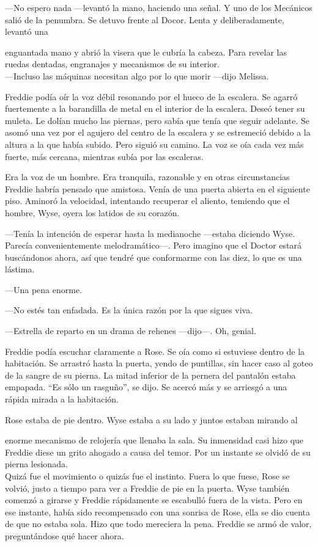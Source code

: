 {---No espero nada ---levantó la mano, haciendo una señal. Y uno de
	los Mecánicos salió de la penumbra. Se detuvo frente al Docor. Lenta
y deliberadamente, levantó una}

{enguantada mano y abrió la visera que le cubría la cabeza. Para
	revelar las ruedas dentadas, engranajes y mecanismos de su interior.\\
	---Incluso las máquinas necesitan algo por lo que morir ---dijo
Melissa.}

{Freddie podía oír la voz débil resonando por el hueco de la
	escalera. Se agarró fuertemente a la barandilla de metal en el
	interior de la escalera. Deseó tener su muleta. Le dolían mucho
	las piernas, pero sabía que tenía que seguir adelante. Se asomó una
	vez por el agujero del centro de la escalera y se estremeció debido a la
	altura a la que había subido. Pero siguió su camino. La voz se oía
cada vez más fuerte, más cercana, mientras subía por las escaleras.}

{Era la voz de un hombre. Era tranquila, razonable y en otras
	circunstancias Freddie habría pensado que amistosa. Venía de una
	puerta abierta en el siguiente piso. Aminoró la velocidad,
	intentando recuperar el aliento, temiendo que el hombre, Wyse, oyera los
latidos de su corazón.}

{---Tenía la intención de esperar hasta la medianoche ---estaba diciendo
	Wyse. Parecía convenientemente melodramático---. Pero imagino
	que el Doctor estará buscándonos ahora, así que tendré que conformarme
con las diez, lo que es una lástima.}

{---Una pena enorme.}

{---No estés tan enfadada. Es la única razón por la que sigues
viva.}

{---Estrella de reparto en un drama de rehenes ---dijo---. Oh,
genial.}

{Freddie podía escuchar claramente a Rose. Se oía como si estuviese
	dentro de la habitación. Se arrastró hasta la puerta, yendo de
	puntillas, sin hacer caso al goteo de la sangre de su pierna. La
	mitad inferior de la pernera del pantalón estaba empapada. ``Es sólo
	un rasguño'', se dijo. Se acercó más y se arriesgó a una rápida
mirada a la habitación.}

{Rose estaba de pie dentro. Wyse estaba a su lado y juntos estaban
mirando al}

{enorme mecanismo de relojería que llenaba la sala. Su inmensidad
	casi hizo que Freddie diese un grito ahogado a causa del temor. Por
	un instante se olvidó de su pierna lesionada.\\
	Quizá fue el movimiento o quizás fue el instinto. Fuera lo que
	fuese, Rose se volvió, justo a tiempo para ver a Freddie de pie en la
	puerta. Wyse también comenzó a girarse y Freddie rápidamente se
	escabulló fuera de la vista. Pero en ese instante, había sido
	recompensado con una sonrisa de Rose, ella se dio cuenta de que no
	estaba sola. Hizo que todo mereciera la pena. Freddie se armó de
	valor, preguntándose qué hacer ahora.\\
}

